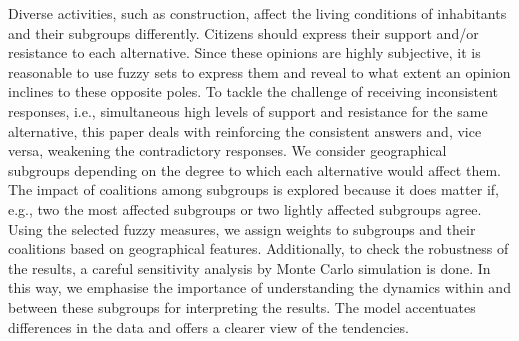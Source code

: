
\begin{Abstrakt}
    Diverse activities, such as construction, affect the living conditions of inhabitants and their subgroups differently. Citizens should express their support and/or resistance to each alternative. Since these opinions are highly subjective, it is reasonable to use fuzzy sets to express them and reveal to what extent an opinion inclines to these opposite poles. To tackle the challenge of receiving inconsistent responses, i.e., simultaneous high levels of support and resistance for the same alternative, this paper deals with reinforcing the consistent answers and, vice versa, weakening the contradictory responses.  We consider geographical subgroups depending on the degree to which each alternative would affect them. The impact of coalitions among subgroups is explored because it does matter if, e.g., two the most affected subgroups or two lightly affected subgroups agree. Using the selected fuzzy measures, we assign weights to subgroups and their coalitions based on geographical features. Additionally, to check the robustness of the results, a careful sensitivity analysis by Monte Carlo simulation is done. In this way, we emphasise the importance of understanding the dynamics within and between these subgroups for interpreting the results. The model accentuates differences in the data and offers a clearer view of the tendencies.
\end{Abstrakt}



\clearpage
